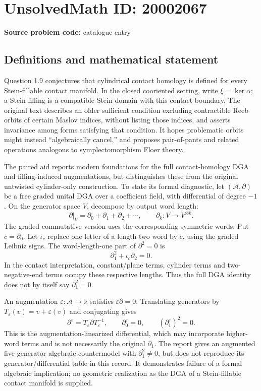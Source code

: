 \documentclass[11pt]{article}
\begin{document}
\section*{UnsolvedMath ID: 20002067}
\textbf{Source problem code:} catalogue entry
\subsection{Definitions and mathematical statement}
Question 1.9 conjectures that cylindrical contact homology is defined for every Stein-fillable contact manifold. In the closed cooriented setting, write \(\xi=\ker\alpha\); a Stein filling is a compatible Stein domain with this contact boundary. The original text describes an older sufficient condition excluding contractible Reeb orbits of certain Maslov indices, without listing those indices, and asserts invariance among forms satisfying that condition. It hopes problematic orbits might instead ``algebraically cancel,'' and proposes pair-of-pants and related operations analogous to symplectomorphism Floer theory.

The paired aid reports modern foundations for the full contact-homology DGA and filling-induced augmentations, but distinguishes these from the original untwisted cylinder-only construction. To state its formal diagnostic, let \((\mathcal A,\partial)\) be a free graded unital DGA over a coefficient field, with differential of degree \(-1\). On the generator space \(V\), decompose by output word length:
\[
 \partial|_V=\partial_0+\partial_1+\partial_2+\cdots,
 \qquad \partial_k:V\to V^{\otimes k}.
\]
The graded-commutative version uses the corresponding symmetric words. Put \(c=\partial_0\). Let \(\iota_c\) replace one letter of a length-two word by \(c\), using the graded Leibniz signs. The word-length-one part of \(\partial^2=0\) is
\[
 \partial_1^2+\iota_c\partial_2=0.
\]
In the contact interpretation, constant/plane terms, cylinder terms and two-negative-end terms occupy these respective lengths. Thus the full DGA identity does not by itself say \(\partial_1^2=0\).

An augmentation \(\varepsilon:\mathcal A\to\mathbb k\) satisfies \(\varepsilon\partial=0\). Translating generators by \(T_\varepsilon(v)=v+\varepsilon(v)\) and conjugating gives
\[
 \partial^\varepsilon=T_\varepsilon\partial T_\varepsilon^{-1},
 \qquad \partial_0^\varepsilon=0,
 \qquad (\partial_1^\varepsilon)^2=0.
\]
This is the augmentation-linearized differential, which may incorporate higher-word terms and is not necessarily the original \(\partial_1\). The report gives an augmented five-generator algebraic countermodel with \(\partial_1^2\ne0\), but does not reproduce its generator/differential table in this record. It demonstrates failure of a formal algebraic implication; no geometric realization as the DGA of a Stein-fillable contact manifold is supplied.
\end{document}

